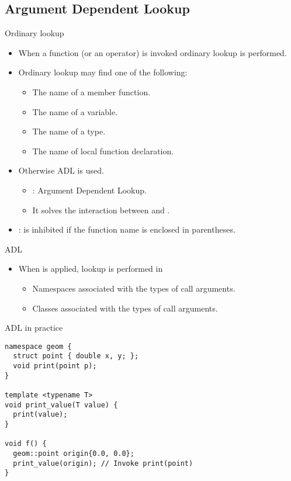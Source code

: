\subsection{Argument Dependent Lookup}

\begin{frame}[t,fragile]{Ordinary lookup}
\begin{itemize}
  \item When a function (or an operator) is invoked ordinary lookup is performed.

  \item Ordinary lookup may find one of the following:
    \begin{itemize}
      \item The name of a member function.
      \item The name of a variable.
      \item The name of a type.
      \item The name of local function declaration.
    \end{itemize}

  \item Otherwise ADL is used.
    \begin{itemize}
      \item {}: Argument Dependent Lookup.
      \item It solves the interaction between 
             and .
    \end{itemize}

  \item {}:  is inhibited if the function name is
        enclosed in parentheses.
\end{itemize}
\end{frame}

\begin{frame}[t,fragile]{ADL}
\begin{itemize}
  \item When  is applied, lookup is performed in
    \begin{itemize}
      \item Namespaces associated with the types of call arguments.
      \item Classes associated with the types of call arguments.
    \end{itemize}
\end{itemize}

\begin{block}{ADL in practice}
\begin{lstlisting}[basicstyle=\mode<presentation>{\tiny}]
namespace geom {
  struct point { double x, y; };
  void print(point p);
}

template <typename T>
void print_value(T value) {
  print(value);
}

void f() {
  geom::point origin{0.0, 0.0};
  print_value(origin); // Invoke print(point)
}
\end{lstlisting}
\end{block}

\end{frame}

